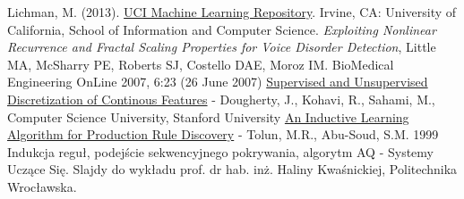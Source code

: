 \documentclass{article}
\begin{document}
\begin{thebibliography}{1} 
 Lichman, M. (2013). \href{http://archive.ics.uci.edu/ml}{UCI Machine Learning Repository}. Irvine, CA: University of California, School of Information and Computer Science.
 \emph{Exploiting Nonlinear Recurrence and Fractal Scaling Properties for Voice Disorder Detection}, Little MA, McSharry PE, Roberts SJ, Costello DAE, Moroz IM. BioMedical Engineering OnLine 2007, 6:23 (26 June 2007)
 \href{http://robotics.stanford.edu/users/sahami/papers-dir/disc.pdf}{Supervised and Unsupervised Discretization of Continous Features} - Dougherty, J., Kohavi, R., Sahami, M., Computer Science University, Stanford University 
 \href{http://www.dis.uniroma1.it/~sassano/STAGE/LearningRule.pdf}{An Inductive Learning Algorithm for Production Rule Discovery} - Tolun, M.R., Abu-Soud, S.M. 1999
 Indukcja reguł, podejście sekwencyjnego pokrywania, algorytm AQ - Systemy Uczące Się. Slajdy do wykładu prof. dr hab. inż. Haliny Kwaśnickiej, Politechnika Wrocławska.
\end{thebibliography}
\end{document}
